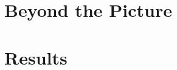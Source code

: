 \chapter{Beyond the \texorpdfstring{\boldmath{$3\nu$}}{3 neutrino} Picture}\label{ch:theory}


\chapter{Results}\label{ch:results}





% 
% 

